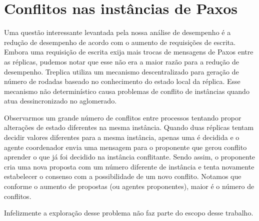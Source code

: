 \begin{table}[htb]
\end{table}


\section{Conflitos nas instâncias de Paxos}\label{sec:problema_conflitos}

Uma questão interessante levantada pela nossa análise de desempenho é a redução de
desempenho de acordo com o aumento de requisições de escrita. Embora uma requisição de
escrita exija mais trocas de mensagens de Paxos entre as réplicas, pudemos notar que esse
não era a maior razão para a redução de desempenho. Treplica utiliza um mecanismo
descentralizado para geração de número de rodadas baseado no conhecimento do estado local
da réplica. Esse mecanismo não determinístico causa problemas de conflito de instâncias
quando atua dessincronizado no aglomerado.

Observarmos um grande número de conflitos entre processos tentando propor alterações de
estado diferentes na mesma instância. Quando duas réplicas tentam decidir valores
diferentes para a mesma instância, apenas uma é decidida e o agente coordenador envia uma
mensagem para o proponente que gerou conflito aprender o que já foi decidido na instância
conflitante. Sendo assim, o proponente cria uma nova proposta com um número diferente de
instância e tenta novamente estabelecer o consenso com a possibilidade de um novo
conflito. Notamos que conforme o aumento de propostas (ou agentes proponentes), maior é o
número de conflitos.

Infelizmente a exploração desse problema não faz parte do escopo desse trabalho.


